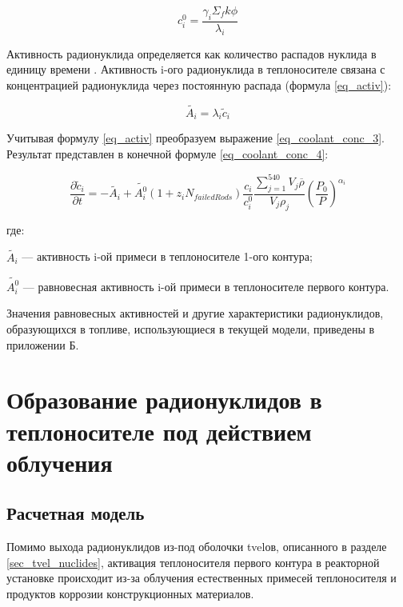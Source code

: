 \begin{equation}
    \label{eq_tvel_equilibrium_conc}
    c_{i}^{0} = \frac{\gamma_{i} \Sigma_{f} k \phi}{\lambda_{i}} 
\end{equation}

Активность радионуклида определяется как количество распадов нуклида в единицу времени \cite{gusev_def}. Активность 
i-ого радионуклида в теплоносителе связана с концентрацией радионуклида через постоянную распада (формула 
\ref{eq_activ}):

\begin{equation}
    \label{eq_activ}
    \widetilde{A_{i}} = \lambda_{i} \widetilde{c}_{i}
\end{equation}

Учитывая формулу \ref{eq_activ} преобразуем выражение \ref{eq_coolant_conc_3}. Результат представлен в конечной формуле 
\ref{eq_coolant_conc_4}:

\begin{equation}
    \label{eq_coolant_conc_4}
    \frac{\partial \widetilde{c}_{i}}{\partial t} = -\widetilde{A_{i}} + \widetilde{A_{i}^{0}}
        (1 + z_{i}N_{failedRods})\frac{c_{i}}{c_{i}^{0}}\frac{\sum_{j=1}^{540} V_{j}\overline{\rho}}{V_{j}\rho_{j}}
        (\frac{P_{0}}{P})^{\alpha_{i}}
\end{equation}

где:
\begin{description}
    \item $\widetilde{A_{i}}$ --- активность i-ой примеси в теплоносителе 1-ого контура;
    \item $\widetilde{A_{i}^{0}}$ --- равновесная активность i-ой примеси в теплоносителе первого контура.
\end{description}

Значения равновесных активностей и другие характеристики радионуклидов, образующихся в топливе, использующиеся в 
текущей модели, приведены в приложении Б.

\section{Образование радионуклидов в теплоносителе под действием облучения}

\subsection{Расчетная модель}

Помимо выхода радионуклидов из-под оболочки \ac{tvel}ов, описанного в разделе \ref{sec_tvel_nuclides}, активация 
теплоносителя первого контура в реакторной установке происходит из-за облучения естественных примесей теплоносителя и 
продуктов коррозии конструкционных материалов. 

